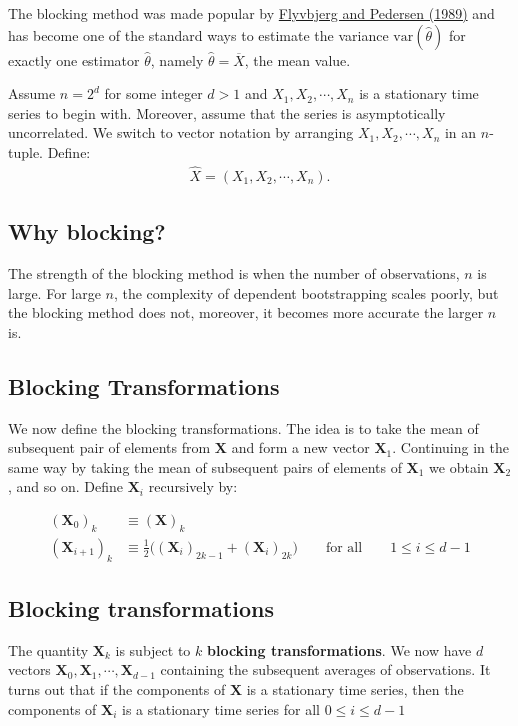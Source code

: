 \documentclass[%
oneside,                 %
final,                   %
10pt]{article}
\begin{document}
The blocking method was made popular by \href{{https://aip.scitation.org/doi/10.1063/1.457480}}{Flyvbjerg and Pedersen (1989)}
and has become one of the standard ways to estimate the variance
$\mathrm{var}(\widehat{\theta})$ for exactly one estimator $\widehat{\theta}$, namely
$\widehat{\theta} = \overline{X}$, the mean value. 

Assume $n = 2^d$ for some integer $d>1$ and $X_1,X_2,\cdots, X_n$ is a stationary time series to begin with. 
Moreover, assume that the series is asymptotically uncorrelated. We switch to vector notation by arranging $X_1,X_2,\cdots,X_n$ in an $n$-tuple. Define:
\begin{align*}
\hat{X} = (X_1,X_2,\cdots,X_n).
\end{align*}

\subsection{Why blocking?}

The strength of the blocking method is when the number of
observations, $n$ is large. For large $n$, the complexity of dependent
bootstrapping scales poorly, but the blocking method does not,
moreover, it becomes more accurate the larger $n$ is.

\subsection{Blocking Transformations}
 We now define the blocking transformations. The idea is to take the mean of subsequent
pair of elements from $\bm{X}$ and form a new vector
$\bm{X}_1$. Continuing in the same way by taking the mean of
subsequent pairs of elements of $\bm{X}_1$ we obtain $\bm{X}_2$, and
so on. 
Define $\bm{X}_i$ recursively by:

\begin{align} 
(\bm{X}_0)_k &\equiv (\bm{X})_k \nonumber \\
(\bm{X}_{i+1})_k &\equiv \frac{1}{2}\Big( (\bm{X}_i)_{2k-1} +
(\bm{X}_i)_{2k} \Big) \qquad \text{for all} \qquad 1 \leq i \leq d-1
\end{align} 

\subsection{Blocking transformations}

The quantity $\bm{X}_k$ is
subject to $k$ \textbf{blocking transformations}.  We now have $d$ vectors
$\bm{X}_0, \bm{X}_1,\cdots,\bm{X}_{d-1}$ containing the subsequent
averages of observations. It turns out that if the components of
$\bm{X}$ is a stationary time series, then the components of
$\bm{X}_i$ is a stationary time series for all $0 \leq i \leq d-1$
\end{document}
